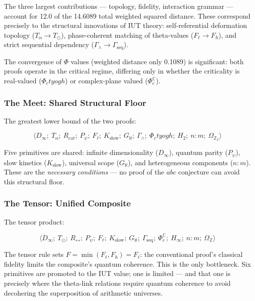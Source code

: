 \documentclass[12pt,a4paper]{article}
\begin{document}
The three largest contributions --- topology, fidelity, interaction grammar --- account for 12.0 of the 14.6089 total weighted squared distance. These correspond precisely to the structural innovations of IUT theory: self-referential deformation topology ($T_{\bowtie} \to T_{\odot}$), phase-coherent matching of theta-values ($F_{\ell} \to F_{\hbar}$), and strict sequential dependency ($\Gamma_{\wedge} \to \Gamma_\text{seq}$).

The convergence of $\Phi$ values (weighted distance only 0.1089) is significant: both proofs operate in the critical regime, differing only in whether the criticality is real-valued ($\Phi_ctyogh$) or complex-plane valued ($\Phi_c^\mathbb{C}$).

\subsubsection{The Meet: Shared Structural Floor}

The greatest lower bound of the two proofs:

\[\langle D_{\infty};\ T_{\bowtie};\ R_\text{cat};\ P_{\psi};\ F_{\ell};\ K_\text{slow};\ G_{\aleph};\ \Gamma_{\wedge};\ \Phi_ctyogh;\ H_2;\ n{:}m;\ \Omega_{\mathbb{Z}_2} \rangle\]

Five primitives are shared: infinite dimensionality ($D_{\infty}$), quantum parity ($P_{\psi}$), slow kinetics ($K_\text{slow}$), universal scope ($G_{\aleph}$), and heterogeneous components ($n{:}m$). These are the \emph{necessary conditions} --- no proof of the $abc$ conjecture can avoid this structural floor.

\subsubsection{The Tensor: Unified Composite}

The tensor product:

\[\langle D_{\infty};\ T_{\odot};\ R_{\leftrightarrow};\ P_{\psi};\ F_{\ell};\ K_\text{slow};\ G_{\aleph};\ \Gamma_\text{seq};\ \Phi_c^\mathbb{C};\ H_{\infty};\ n{:}m;\ \Omega_\mathbb{Z} \rangle\]

The tensor rule sets $F = \min(F_{\ell}, F_{\hbar}) = F_{\ell}$: the conventional proof's classical fidelity limits the composite's quantum coherence. This is the only bottleneck. Six primitives are promoted to the IUT value; one is limited --- and that one is precisely where the theta-link relations require quantum coherence to avoid decohering the superposition of arithmetic universes.
\end{document}

